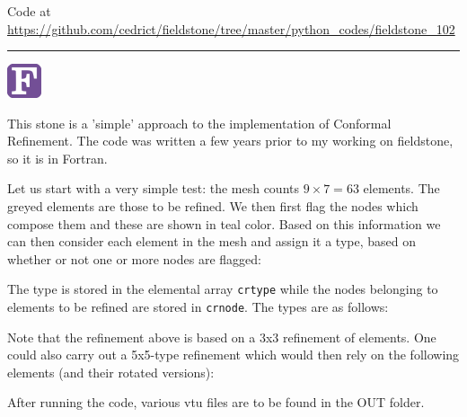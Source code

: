 

\begin{center}
Code at \url{https://github.com/cedrict/fieldstone/tree/master/python_codes/fieldstone_102}
\end{center}

\par\noindent\rule{\textwidth}{0.4pt}


\begin{center}
\includegraphics[width=1cm]{images/fortran/fortran} 
\end{center}

This stone is a 'simple' approach to the implementation of Conformal Refinement. The code was written 
a few years prior to my working on fieldstone, so it is in Fortran. 

Let us start with a very simple test: the mesh counts $9\times 7=63$ elements.
The greyed elements are those to be refined. We then first flag the nodes which compose them and these are shown in teal color.
Based on this information we can then consider each element in the mesh and assign it a type, based on whether or not one or more nodes are flagged:

\begin{center}

\end{center}

The type is stored in the elemental array {\tt crtype} while the nodes belonging to elements to be refined are stored in {\tt crnode}.
The types are as follows:

\begin{center}

\end{center}

Note that the refinement above is based on a 3x3 refinement of elements. One could also carry out a 5x5-type
refinement which would then rely on the following elements (and their rotated versions):
\begin{center}

\end{center}

After running the code, various vtu files are to be found in the OUT folder.

